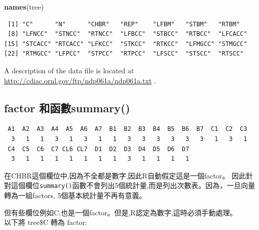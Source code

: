 \documentclass[]{book}
\newenvironment{Shaded}{\begin{snugshade}}{\end{snugshade}}
\newcommand{\KeywordTok}[1]{\textcolor[rgb]{0.13,0.29,0.53}{\textbf{#1}}}
\newcommand{\NormalTok}[1]{#1}
\newcommand{\OperatorTok}[1]{\textcolor[rgb]{0.81,0.36,0.00}{\textbf{#1}}}
\theoremstyle{definition}
\theoremstyle{definition}
\theoremstyle{definition}
\theoremstyle{remark}
\begin{document}
\begin{Shaded}
\begin{Highlighting}[]
\KeywordTok{names}\NormalTok{(tree)}
\end{Highlighting}
\end{Shaded}

\begin{verbatim}
 [1] "C"      "N"      "CHBR"   "REP"    "LFBM"   "STBM"   "RTBM"  
 [8] "LFNCC"  "STNCC"  "RTNCC"  "LFBCC"  "STBCC"  "RTBCC"  "LFCACC"
[15] "STCACC" "RTCACC" "LFKCC"  "STKCC"  "RTKCC"  "LFMGCC" "STMGCC"
[22] "RTMGCC" "LFPCC"  "STPCC"  "RTPCC"  "LFSCC"  "STSCC"  "RTSCC" 
\end{verbatim}

A description of the data file is located at
\url{http://cdiac.ornl.gov/ftp/ndp061a/ndp061a.txt} .

\hypertarget{factor-summary}{%
\subsection{factor 和函數summary()}\label{factor-summary}}

\begin{Shaded}
\end{Shaded}

\begin{verbatim}
 A1  A2  A3  A4  A5  A6  A7  B1  B2  B3  B4  B5  B6  B7  C1  C2  C3 
  3   1   1   3   1   3   1   1   3   3   3   3   3   3   1   3   1 
 C4  C5  C6  C7 CL6 CL7  D1  D2  D3  D4  D5  D6  D7 
  3   1   1   1   1   1   1   1   3   1   1   1   1 
\end{verbatim}

在CHBR這個欄位中,因為不全都是數字,因此R自動假定這是一個factor。
因此針對這個欄位\texttt{summary()}函數不會列出5個統計量,而是列出次數表。因為，一旦向量轉為一組factors,
5個基本統計量不再有意義。

但有些欄位例如C,也是一個factor。但是,R認定為數字,這時必須手動處理。\\
以下將 tree\$C 轉為 factor:

\begin{Shaded}
\end{Shaded}
\end{document}
